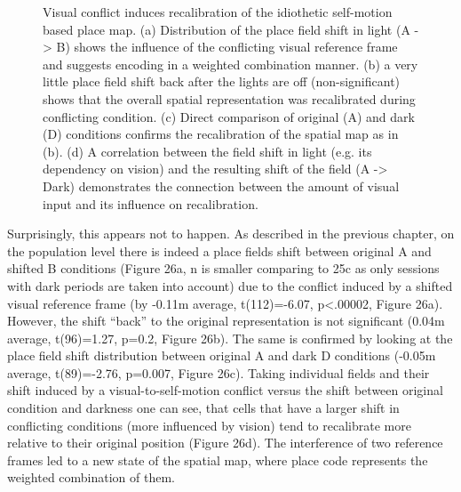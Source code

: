 \begin{figure}
\captionsetup{format=plain}
\caption[Recalibration of the self-motion map]{
Visual conflict induces recalibration of the idiothetic self-motion based place map. (a) Distribution of the place field shift in light (A -> B) shows the influence of the conflicting visual reference frame and suggests encoding in a weighted combination manner. (b) a very little place field shift back after the lights are off (non-significant) shows that the overall spatial representation was recalibrated during conflicting condition. (c) Direct comparison of original (A) and dark (D) conditions confirms the recalibration of the spatial map as in (b). (d) A correlation between the field shift in light (e.g. its dependency on vision) and the resulting shift of the field (A -> Dark) demonstrates the connection between the amount of visual input and its influence on recalibration.
}
\label{fig:F26_recalibration}
\end{figure}

Surprisingly, this appears not to happen. As described in the previous chapter, on the population level there is indeed a place fields shift between original A and shifted B conditions (Figure 26a, n is smaller comparing to 25c as only sessions with dark periods are taken into account) due to the conflict induced by a shifted visual reference frame (by -0.11m average, t(112)=-6.07, p<.00002, Figure 26a). However, the shift “back” to the original representation is not significant (0.04m average, t(96)=1.27, p=0.2, Figure 26b). The same is confirmed by looking at the place field shift distribution between original A and dark D conditions (-0.05m average, t(89)=-2.76, p=0.007, Figure 26c). Taking individual fields and their shift induced by a visual-to-self-motion conflict versus the shift between original condition and darkness one can see, that cells that have a larger shift in conflicting conditions (more influenced by vision) tend to recalibrate more relative to their original position (Figure 26d). The interference of two reference frames led to a new state of the spatial map, where place code represents the weighted combination of them.

